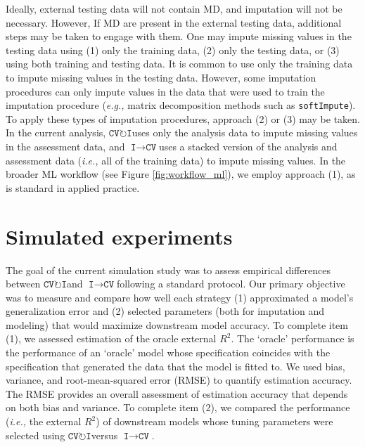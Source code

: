 \documentclass[AMA,STIX1COL,doublespace]{WileyNJD-v2}
\begin{document}
Ideally, external testing data will not contain MD, and imputation will
not be necessary. However, If MD are present in the external testing
data, additional steps may be taken to engage with them. One may impute
missing values in the testing data using (1) only the training data, (2)
only the testing data, or (3) using both training and testing data. It
is common to use only the training data to impute missing values in the
testing data. However, some imputation procedures can only impute values
in the data that were used to train the imputation procedure
(\textit{e.g., }matrix decomposition methods such as
\texttt{softImpute}).\citep{softImpute} To apply these types of
imputation procedures, approach (2) or (3) may be taken. In the current
analysis, $\texttt{CV}\!\circlearrowright\!\texttt{I}$\space uses only
the analysis data to impute missing values in the assessment data, and
$\texttt{I}\!\!\rightarrow\!\texttt{CV}$\space uses a stacked version of
the analysis and assessment data (\textit{i.e., }all of the training
data) to impute missing values. In the broader ML workflow (see Figure
\ref{fig:workflow_ml}), we employ approach (1), as is standard in
applied practice.

\section{Simulated experiments} \label{sec:sim}

The goal of the current simulation study was to assess empirical
differences between
$\texttt{CV}\!\circlearrowright\!\texttt{I}$\space and
$\texttt{I}\!\!\rightarrow\!\texttt{CV}$\space following a standard
protocol.\cite{morris2019using} Our primary objective was to measure and
compare how well each strategy (1) approximated a model's generalization
error and (2) selected parameters (both for imputation and modeling)
that would maximize downstream model accuracy. To complete item (1), we
assessed estimation of the oracle external \(R^2\). The `oracle'
performance is the performance of an `oracle' model whose specification
coincides with the specification that generated the data that the model
is fitted to. We used bias, variance, and root-mean-squared error (RMSE)
to quantify estimation accuracy. The RMSE provides an overall assessment
of estimation accuracy that depends on both bias and variance. To
complete item (2), we compared the performance (\textit{i.e., }the
external \(R^2\)) of downstream models whose tuning parameters were
selected using $\texttt{CV}\!\circlearrowright\!\texttt{I}$\space versus
$\texttt{I}\!\!\rightarrow\!\texttt{CV}$.
\end{document}
